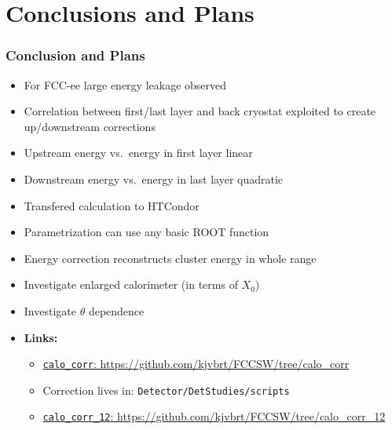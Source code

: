 \documentclass{beamer}
\newcommand{\backupbegin}{%
   \newcounter{finalframe}
   \setcounter{finalframe}{\value{framenumber}}
}
\newcommand{\backupend}{%
   \setcounter{framenumber}{\value{finalframe}}
}
\newcommand{\bluetext}[1]{%
  \textcolor{myBlue}{#1}
}
\newcommand{\redtext}[1]{%
  \textcolor{myRed}{#1}
}
\begin{document}
\section{Conclusions and Plans}

\begin{frame}
  \frametitle{Conclusion and Plans}

  \begin{itemize}
    \item For FCC-ee large energy leakage observed
    \item Correlation between first/last layer and back cryostat exploited to create
          up/downstream corrections
    \item \redtext{Upstream} energy vs.\ energy in first layer \redtext{linear}
    \item \redtext{Downstream} energy vs.\ energy in last layer
          \redtext{quadratic}
    \item Transfered calculation to HTCondor
    \item Parametrization can use any basic ROOT function
    \item Energy correction reconstructs cluster energy in whole range
    \item Investigate enlarged calorimeter (in terms of $X_{0}$)
    \item Investigate $\theta$ dependence
    \item \bluetext{\bf Links:}
          \begin{itemize}
            \item \href{https://github.com/kjvbrt/FCCSW/tree/calo_corr}
                  {\footnotesize \bluetext{\texttt{calo\_corr}: https://github.com/kjvbrt/FCCSW/tree/calo\_corr}}
            \item {\footnotesize \bluetext{Correction lives in: \texttt{Detector/DetStudies/scripts}}}
            \item \href{https://github.com/kjvbrt/FCCSW/tree/calo_corr_12}
                  {\scriptsize \bluetext{\texttt{calo\_corr\_12}: https://github.com/kjvbrt/FCCSW/tree/calo\_corr\_12}}
          \end{itemize}
  \end{itemize}
\end{frame}


%
%
\end{document}
